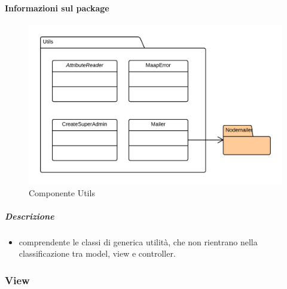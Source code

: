   \paragraph{Informazioni sul package} 
    \begin{figure}[H] 
      \begin{center} 
        \includegraphics[width=\textwidth]{uml/package/Back-end::Lib::Utils.png}  
        \caption{Componente Utils}
      \end{center}  
    \end{figure} 
  \subparagraph{Descrizione} 
    \begin{itemize}
    \item[]  comprendente le classi di generica utilità, che non rientrano nella classificazione tra model, view e controller.
    \end{itemize} 
  \subsubsection{View}
